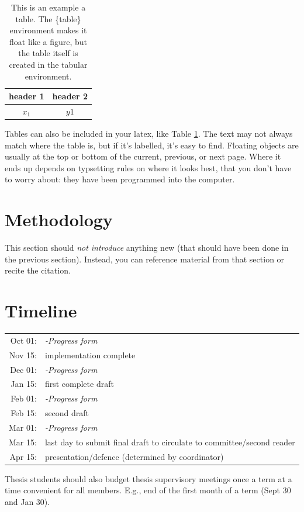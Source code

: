 \documentclass[12pt]{article}
\begin{document}
\begin{table}
	\centering
		\caption{\label{tab:sampletable1} This is an example a table. The \{table\} environment makes it float like a figure, but the table itself is created in the tabular environment.  }
	\begin{tabular}{|c| c|}
		\hline
		header 1 & header 2 \\
		\hline
		$x_1$ & $y1$\\
		\hline
	\end{tabular}
\end{table}
Tables can also be included in your latex, like Table \ref{tab:sampletable1}. The text may not always match where the table is, but if it's labelled, it's easy to find. Floating objects are usually at the top or bottom of the current, previous, or next page. Where it ends up depends on typsetting rules on where it looks best, that you don't have to worry about: they have been programmed into the computer.

	\section{Methodology}
	This section should \emph{not introduce} anything new (that should have been done in the previous section). Instead, you can reference material from that section or recite the citation. 
	\section{Timeline}
	\begin{tabular}{r p{}}
		Oct 01:& \emph{-Progress form}\\
		Nov 15:& implementation complete\\
		Dec 01:& \emph{-Progress form}\\
		Jan 15:& first complete draft\\
		Feb 01:& \emph{-Progress form}\\
		Feb 15:& second draft\\
		Mar 01:& \emph{-Progress form}\\
		Mar 15:& last day to submit final draft to circulate to committee/second reader\\
		Apr 15:& presentation/defence (determined by coordinator)\\
	\end{tabular}

Thesis students should also budget thesis supervisory  meetings once a term at a time convenient for all members. E.g., end of the first month of a term (Sept 30 and Jan 30).
\end{document}
